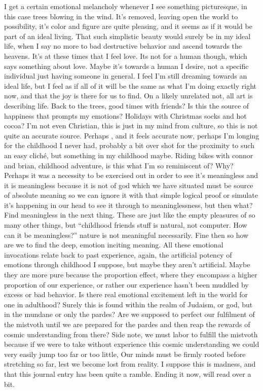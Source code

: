 I get a certain emotional melancholy whenever I see something
picturesque, in this case trees blowing in the wind. It's removed,
leaving open the world to possibility, it's color and figure are quite
pleasing, and it seems as if it would be part of an ideal living. That
such simplistic beauty would surely be in my ideal life, when I say no
more to bad destructive behavior and ascend towards the heavens. It's at
these times that I feel love. Its not for a human though, which says
something about love. Maybe it's towards a human I desire, not a
specific individual just having someone in general. I feel I'm still
dreaming towards an ideal life, but I feel as if all of it will be the
same as what I'm doing exactly right now, and that the joy is there for
us to find. On a likely unrelated not, all art is describing life. Back
to the trees, good times with friends? Is this the source of happiness
that prompts my emotions? Holidays with Christmas socks and hot cocoa?
I'm not even Christian, this is just in my mind from culture, so this is
not quite an accurate source. Perhaps , and it feels accurate now,
perhaps I'm longing for the childhood I never had, probably a bit over
shot for the proximity to such an easy cliché, but something in my
childhood maybe. Riding bikes with connor and brian, childhood
adventure, is this what I'm so reminiscent of? Why? Perhaps it was a
necessity to be exercised out in order to see it's meaningless and it is
meaningless because it is not of god which we have situated must be
source of absolute meaning so we can ignore it with that simple logical
proof or simulate it's happening in our head to see it through to
meaninglessness, but then what? Find meaningless in the next thing.
These are just like the empty pleasures of so many other things, but
``childhood friends stuff is natural, not computer. How can it be
meaningless?'' nature is not meaningful necessarily. Fine then so how
are we to find the deep, emotion inciting meaning. All these emotional
invocations relate back to past experience, again, the artificial
potency of emotions through childhood I suppose, but maybe they aren't
artificial. Maybe they are more pure because the proportion effect,
where they encompass a higher proportion of our experience, or rather
our experience hasn't been muddled by excess or bad behavior. Is there
real emotional excitement left in the world for one in adulthood? Surely
this is found within the realm of Judaism, or god, but in the mundane or
only the pardes? Are we supposed to perfect our fulfilment of the
mistvoth until we are prepared for the pardes and then reap the rewards
of cosmic understanding from there? Side note, we must labor to fulfill
the mistvoth because if we were to take without experience this cosmic
understanding we could very easily jump too far or too little, Our minds
must be firmly rooted before stretching so far, lest we become lost from
reality. I suppose this is madness, and that this journal entry has been
quite a ramble. Ending it now, will read over a bit.

